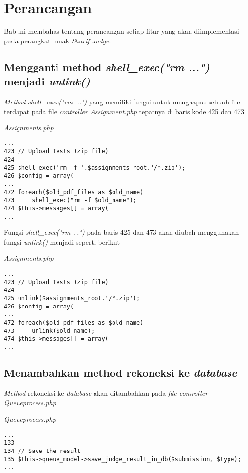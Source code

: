 \chapter{Perancangan}
\label{chap:perancangan}

Bab ini membahas tentang perancangan setiap fitur yang akan diimplementasi pada perangkat lunak \textit{Sharif Judge}. 

\section{Mengganti method \textit{shell\_exec("rm ...")} menjadi \textit{unlink()}}
\textit{Method} \textit{shell\_exec("rm ...")} yang memiliki fungsi untuk menghapus sebuah file terdapat pada file \textit{controller Assignment.php} tepatnya di baris kode 425 dan 473

\textit{Assignments.php}
\begin{lstlisting}[basicstyle=\ttfamily, frame=single,
columns=fullflexible, keepspaces=true]
...
423	// Upload Tests (zip file)
424	
425	shell_exec('rm -f '.$assignments_root.'/*.zip');
426	$config = array(
...
472	foreach($old_pdf_files as $old_name)
473		shell_exec("rm -f $old_name");
474	$this->messages[] = array(
...
\end{lstlisting}

Fungsi \textit{shell\_exec("rm ...")} pada baris 425 dan 473 akan diubah menggunakan fungsi \textit{unlink()} menjadi seperti berikut

\textit{Assignments.php}
\begin{lstlisting}[basicstyle=\ttfamily, frame=single,
columns=fullflexible, keepspaces=true]
...
423	// Upload Tests (zip file)
424	
425	unlink($assignments_root.'/*.zip');
426	$config = array(
...
472	foreach($old_pdf_files as $old_name)
473		unlink($old_name);
474	$this->messages[] = array(
...
\end{lstlisting}

\section{Menambahkan method rekoneksi ke \textit{database}}
\textit{Method} rekoneksi ke \textit{database} akan ditambahkan pada \textit{file controller Queueprocess.php}. 

\textit{Queueprocess.php}
\begin{lstlisting}[basicstyle=\ttfamily, frame=single,
columns=fullflexible, keepspaces=true]
...
133
134	// Save the result
135	$this->queue_model->save_judge_result_in_db($submission, $type);
...
\end{lstlisting}

